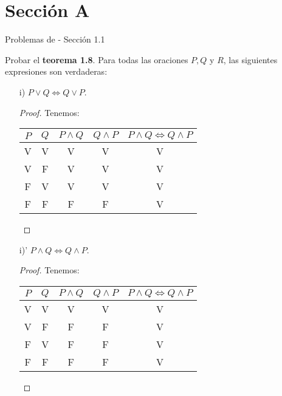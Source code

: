 





	\section{Sección A }
Problemas de \cite{pinter2014book} - Sección 1.1
	
	\begin{problema}[Problema 1]
		Probar el \textbf{teorema 1.8}. Para todas las oraciones $P,Q$ y $R$, las siguientes expresiones son verdaderas:
		\begin{enumerate}
			\item[i)] $P\vee Q \iff Q\vee P$.
\begin{proof} Tenemos:
	\begin{table}[H]
		\centering 
		\begin{tabular}{|c|c|c|c|c|}
			\hline
			$P$ & $Q$ & $P \wedge Q$ & $Q\wedge P$ & $P\wedge Q\iff Q\wedge P$ \\ \hline
			V   & V   & V            & V           & V                         \\ \hline
			V   & F   & V            & V           & V                         \\ \hline
			F   & V   & V            & V           & V                         \\ \hline
			F   & F   & F            & F           & V                         \\ \hline
		\end{tabular}
	\end{table}


\end{proof}
			

			\item[i)'] $P\wedge Q \iff Q\wedge P$.
			\begin{proof}
				Tenemos: 
				
				\begin{table}[H]
					\centering
					\begin{tabular}{|c|c|c|c|c|}
						\hline
						$P$ & $Q$ & $P \wedge Q$ & $Q\wedge P$ & $P\wedge Q\iff Q\wedge P$ \\ \hline
						V   & V   & V            & V           & V                         \\ \hline
						V   & F   & F            & F           & V                         \\ \hline
						F   & V   & F            & F           & V                         \\ \hline
						F   & F   & F            & F           & V                         \\ \hline
					\end{tabular}
				\end{table}
			

\end{proof}
\end{enumerate}
\end{problema}
